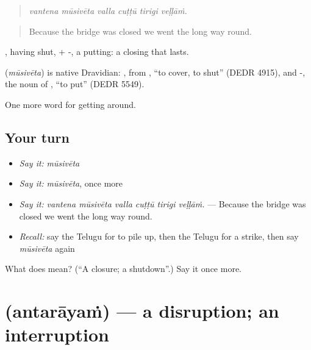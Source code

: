 \begin{quote}
\emph{vantena mūsivēta valla cuṭṭū tirigi veḷḷāṁ.}
\end{quote}

\begin{quote}
Because the bridge was closed we went the long way round.
\end{quote}

, having shut, + -, a putting: a closing that lasts.

\begin{cousinweb}
\textbf{} (\emph{mūsivēta}) is native Dravidian: , from , \textquotedblleft{}to cover, to shut\textquotedblright{} (DEDR 4915), and -, the noun of , \textquotedblleft{}to put\textquotedblright{} (DEDR 5549).
\end{cousinweb}

\begin{grammarlens}[title={What you've built}]
One more word for getting around.
\end{grammarlens}

\subsection*{Your turn}
\begin{itemize}
\raggedright
  \item \emph{Say it:} \emph{mūsivēta}
  \item \emph{Say it:} \emph{mūsivēta}, once more
  \item \emph{Say it:} \emph{vantena mūsivēta valla cuṭṭū tirigi veḷḷāṁ.} — Because the bridge was closed we went the long way round.
  \item \emph{Recall:} say the Telugu for to pile up, then the Telugu for a strike, then say \emph{mūsivēta} again
\end{itemize}

\begin{tcolorbox}[breakable,colback=teal!4,colframe=teal!35!black,title={Before you move on}]
What does  mean? (\textquotedblleft{}A closure; a shutdown\textquotedblright{}.) Say it once more.
\end{tcolorbox}
\section[\texorpdfstring{\te{అంతరాయం} (antarāyaṁ)}{అంతరాయం (antarāyaṁ)}]{ (antarāyaṁ) — a disruption; an interruption}

